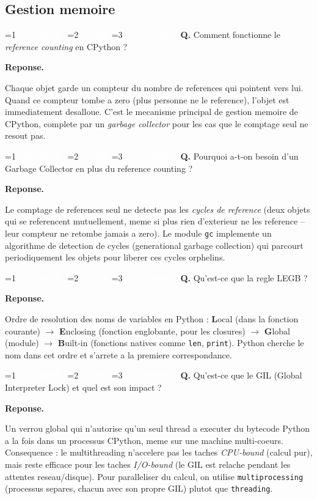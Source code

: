 \documentclass[11pt,a4paper]{article}
\newcommand{\badgeJ}{\textcolor{white}{\colorbox{junior}{\small\bfseries\ JUNIOR\ }}}
\newcommand{\badgeM}{\textcolor{white}{\colorbox{mid}{\small\bfseries\ MID\ }}}
\newcommand{\badgeS}{\textcolor{white}{\colorbox{senior}{\small\bfseries\ SENIOR\ }}}
\newcounter{qcount}
\newenvironment{qa}[2]{%
  \stepcounter{qcount}%
  \par\vspace{6pt}%
  \noindent\colorbox{qbg}{\parbox{\dimexpr\linewidth-12pt}{\vspace{2pt}%
  \ifnum#1=1 \badgeJ\fi\ifnum#1=2 \badgeM\fi\ifnum#1=3 \badgeS\fi
  \ \textbf{Q\theqcount.} #2\vspace{2pt}}}\par\vspace{4pt}%
  \noindent\textbf{\color{accent}Reponse.}\ \ignorespaces
}{%
  \par\vspace{8pt}%
}
\begin{document}
\subsection{Gestion memoire}

\begin{qa}{2}{Comment fonctionne le \emph{reference counting} en CPython ?}
Chaque objet garde un compteur du nombre de references qui pointent vers lui.
Quand ce compteur tombe a zero (plus personne ne le reference), l'objet est
immediatement desalloue. C'est le mecanisme principal de gestion memoire de
CPython, complete par un \emph{garbage collector} pour les cas que le comptage
seul ne resout pas.
\end{qa}

\begin{qa}{2}{Pourquoi a-t-on besoin d'un Garbage Collector en plus du reference counting ?}
Le comptage de references seul ne detecte pas les \emph{cycles de reference}
(deux objets qui se referencent mutuellement, meme si plus rien d'exterieur ne
les reference -- leur compteur ne retombe jamais a zero). Le module
\texttt{gc} implemente un algorithme de detection de cycles (generational
garbage collection) qui parcourt periodiquement les objets pour liberer ces
cycles orphelins.
\end{qa}

\begin{qa}{2}{Qu'est-ce que la regle LEGB ?}
Ordre de resolution des noms de variables en Python : \textbf{L}ocal (dans la
fonction courante) $\rightarrow$ \textbf{E}nclosing (fonction englobante, pour
les closures) $\rightarrow$ \textbf{G}lobal (module) $\rightarrow$
\textbf{B}uilt-in (fonctions natives comme \texttt{len}, \texttt{print}).
Python cherche le nom dans cet ordre et s'arrete a la premiere correspondance.
\end{qa}

\begin{qa}{3}{Qu'est-ce que le GIL (Global Interpreter Lock) et quel est son impact ?}
Un verrou global qui n'autorise qu'un seul thread a executer du bytecode
Python a la fois dans un processus CPython, meme sur une machine
multi-coeurs. Consequence : le multithreading n'accelere pas les taches
\emph{CPU-bound} (calcul pur), mais reste efficace pour les taches
\emph{I/O-bound} (le GIL est relache pendant les attentes reseau/disque). Pour
paralleliser du calcul, on utilise \texttt{multiprocessing} (processus
separes, chacun avec son propre GIL) plutot que \texttt{threading}.
\end{qa}
\end{document}
